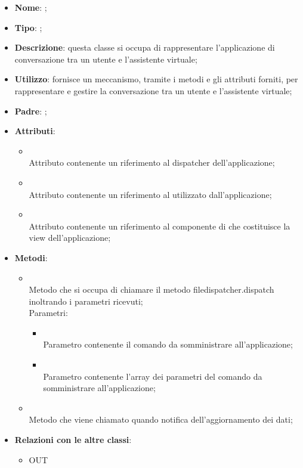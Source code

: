 \begin{itemize}
	\item \textbf{Nome}: ;
	\item \textbf{Tipo}: ;
	\item \textbf{Descrizione}: questa classe si occupa di rappresentare l'applicazione di conversazione tra un utente e l'assistente virtuale;
	\item \textbf{Utilizzo}: fornisce un meccanismo, tramite i metodi e gli attributi forniti, per rappresentare e gestire la conversazione tra un utente e l'assistente virtuale;
	\item \textbf{Padre}: ;
	\item \textbf{Attributi}:
	\begin{itemize}
		\item[]  \\
		Attributo contenente un riferimento al dispatcher dell'applicazione;
		\item[]  \\
		Attributo contenente un riferimento al  utilizzato dall'applicazione;
		\item[]  \\
		Attributo contenente un riferimento al componente di  che costituisce la view dell'applicazione;
	\end{itemize}
	\item \textbf{Metodi}:
	\begin{itemize}
		\item[]  \\
		Metodo che si occupa di chiamare il metodo file{dispatcher.dispatch} inoltrando i parametri ricevuti;\\

		Parametri:
		\begin{itemize}
			\item {} \\
			Parametro contenente il comando da somministrare all'applicazione;
			\item {} \\
			Parametro contenente l'array dei parametri del comando da somministrare all'applicazione;
		\end{itemize}
		\item[]  \\
		Metodo che viene chiamato quando  notifica dell'aggiornamento dei dati;\\
	\end{itemize}
	\item \textbf{Relazioni con le altre classi}:
	\begin{itemize}
		\item OUT \hyperlink{Application_label}{}
	\end{itemize}
\end{itemize}
\FloatBarrier

